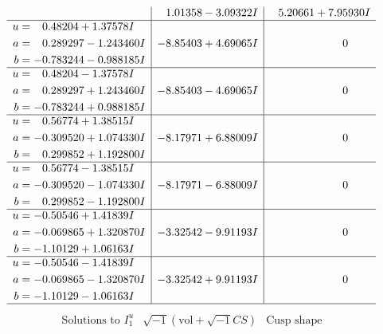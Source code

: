 \documentclass[1p]{elsarticle_modified}
\theoremstyle{definition}
\newcommand{\I}{\sqrt{-1}}
\begin{document}
$$\begin{array}{c|c|c}
 & \phantom{-}1.01358 - 3.09322 I & \phantom{-}5.20661 + 7.95930 I \\ \hline\begin{aligned}
u &= \phantom{-}0.48204 + 1.37578 I \\
a &= \phantom{-}0.289297 - 1.243460 I \\
b &= -0.783244 - 0.988185 I\end{aligned}
 & -8.85403 + 4.69065 I & \phantom{-0.000000 } 0 \\ \hline\begin{aligned}
u &= \phantom{-}0.48204 - 1.37578 I \\
a &= \phantom{-}0.289297 + 1.243460 I \\
b &= -0.783244 + 0.988185 I\end{aligned}
 & -8.85403 - 4.69065 I & \phantom{-0.000000 } 0 \\ \hline\begin{aligned}
u &= \phantom{-}0.56774 + 1.38515 I \\
a &= -0.309520 + 1.074330 I \\
b &= \phantom{-}0.299852 + 1.192800 I\end{aligned}
 & -8.17971 + 6.88009 I & \phantom{-0.000000 } 0 \\ \hline\begin{aligned}
u &= \phantom{-}0.56774 - 1.38515 I \\
a &= -0.309520 - 1.074330 I \\
b &= \phantom{-}0.299852 - 1.192800 I\end{aligned}
 & -8.17971 - 6.88009 I & \phantom{-0.000000 } 0 \\ \hline\begin{aligned}
u &= -0.50546 + 1.41839 I \\
a &= -0.069865 + 1.320870 I \\
b &= -1.10129 + 1.06163 I\end{aligned}
 & -3.32542 - 9.91193 I & \phantom{-0.000000 } 0 \\ \hline\begin{aligned}
u &= -0.50546 - 1.41839 I \\
a &= -0.069865 - 1.320870 I \\
b &= -1.10129 - 1.06163 I\end{aligned}
 & -3.32542 + 9.91193 I & \phantom{-0.000000 } 0\\
 \hline 
 \end{array}$$\newpage$$\begin{array}{c|c|c}  
\text{Solutions to }I^u_{1}& \I (\text{vol} + \sqrt{-1}CS) & \text{Cusp shape}\\

\end{array}$$
\end{document}

